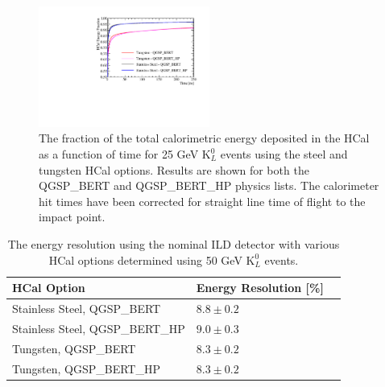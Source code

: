 \begin{figure}
\centering
\includegraphics[width=0.5\textwidth]{OptimisationStudies/Plots/Description/HCalAbsorberMaterialTimings.pdf}
\caption[The fraction of the total calorimetric energy deposited in the HCal as a function of time for 25 GeV $\text{K}^{0}_{L}$ events using the steel and tungsten HCal options.  Results are shown for both the QGSP\_BERT and QGSP\_BERT\_HP physics lists.  The calorimeter hit times have been corrected for straight line time of flight to the impact point.]{The fraction of the total calorimetric energy deposited in the HCal as a function of time for 25 GeV $\text{K}^{0}_{L}$ events using the steel and tungsten HCal options.  Results are shown for both the QGSP\_BERT and QGSP\_BERT\_HP physics lists.  The calorimeter hit times have been corrected for straight line time of flight to the impact point.}
\label{fig:hcalabsmaterialtiming}
\end{figure} 


\begin{table}[h!]
\centering
\begin{tabular}{ l l l }
\hline
HCal Option & Energy Resolution [\%] \\
\hline
Stainless Steel, QGSP\_BERT & $8.8\pm0.2$ \\
Stainless Steel, QGSP\_BERT\_HP & $9.0\pm0.3$ \\
Tungsten, QGSP\_BERT & $8.3\pm0.2$ \\
Tungsten, QGSP\_BERT\_HP & $8.3\pm0.2$ \\
\hline
\end{tabular}
\caption[The energy resolution using the nominal ILD detector with various HCal options determined using 50 GeV $\text{K}^{0}_{L}$ events.]{The energy resolution using the nominal ILD detector with various HCal options determined using 50 GeV $\text{K}^{0}_{L}$ events.}
\label{table:erhcalabsmaterial}
\end{table}

